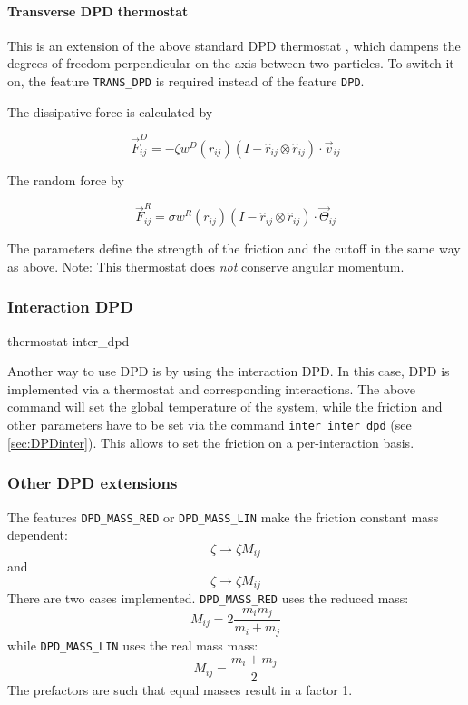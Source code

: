 \paragraph{Transverse DPD thermostat}\label{sec:transDPD}
This is an extension of the above standard DPD thermostat
\cite{junghans2008}, which dampens the degrees of freedom
perpendicular on the axis between two particles. To switch it on, the
feature \texttt{TRANS_DPD} is required instead of the feature
\texttt{DPD}.

The dissipative force is calculated by

$$ \vec{F}_{ij}^{D} = -\zeta w^D (r_{ij}) (I-\hat{r}_{ij}\otimes\hat{r}_{ij}) \cdot \vec{v}_{ij}$$

The random force by

$$ \vec{F}_{ij}^R = \sigma w^R (r_{ij}) (I-\hat{r}_{ij}\otimes\hat{r}_{ij}) \cdot \vec{\Theta}_{ij}$$

The parameters   define the strength of the
friction and the cutoff in the same way as above.  Note: This
thermostat does \emph{not} conserve angular momentum.

\subsubsection{Interaction DPD}\label{sec:interDPD}

\begin{essyntax}
  thermostat inter_dpd 
  \begin{features}
  \end{features}
\end{essyntax}

Another way to use DPD is by using the interaction DPD. In this case,
DPD is implemented via a thermostat and corresponding interactions.
The above command will set the global temperature of the system, while
the friction and other parameters have to be set via the command
\texttt{inter inter_dpd} (see \vref{sec:DPDinter}).  This allows to
set the friction on a per-interaction basis.

\subsubsection{Other DPD extensions}
The features \texttt{DPD_MASS_RED} or \texttt{DPD_MASS_LIN} make the
friction constant mass dependent:
$$ \zeta \to \zeta M_{ij} $$ 
and 
$$ \zeta \to \zeta M_{ij} $$
There are two cases implemented. \texttt{DPD_MASS_RED} uses the
reduced mass:
$$ M_{ij}=2\frac{m_i m_j}{m_i+m_j} $$
while \texttt{DPD_MASS_LIN} uses the real mass mass:
$$ M_{ij}=\frac{m_i+m_j}{2} $$
The prefactors are such that equal masses result in a factor 1.

